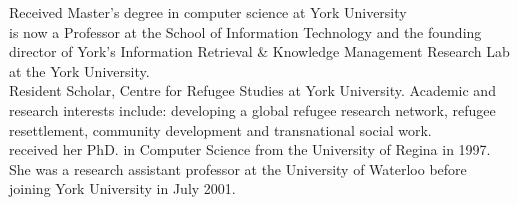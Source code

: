 \documentclass[11pt,letterpaper]{llncs}
\begin{document}
 Received Master's degree in computer science at York University \\

 is now a Professor at the School of Information Technology and the founding director of York’s Information Retrieval \& Knowledge Management Research Lab at the York University. \\

 Resident Scholar, Centre for Refugee Studies at York University. Academic and research interests include: developing a global refugee research network, refugee resettlement, community development and transnational social work. \\

 received her PhD. in Computer Science from the University of Regina in 1997. She was a research assistant professor at the University of Waterloo before joining York University in July 2001.
\end{document}
